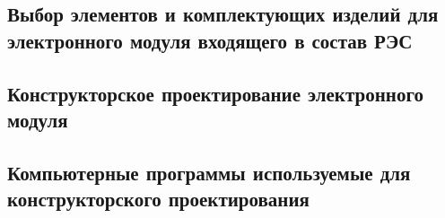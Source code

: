 \subsection{Выбор элементов и комплектующих изделий для электронного модуля входящего в состав РЭС}

\subsection{Конструкторское проектирование электронного модуля}

\subsection{Компьютерные программы используемые для конструкторского проектирования}

\newpage

